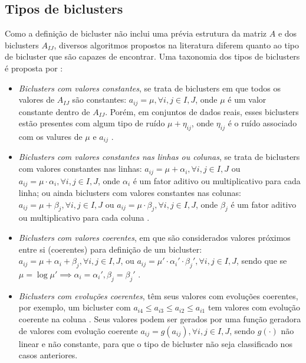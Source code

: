 \documentclass[normaltoc, espacoumemeio, pnumromarab,ruledheader]{abnt}
\begin{document}
\subsection{Tipos de biclusters}
\label{sec:tiposbic}

Como a definição de bicluster não inclui uma prévia estrutura da matriz $A$ e dos biclusters $A_{IJ}$, diversos algoritmos propostos na literatura diferem quanto ao tipo de bicluster que são capazes de encontrar. Uma taxonomia dos tipos de biclusters é proposta por :
 \begin{itemize}
  \item \textit{Biclusters com valores constantes}, se trata de biclusters em que todos os valores de $A_{IJ}$ são constantes: $a_{ij} = \mu, \forall i,j \in I,J$, onde $\mu$ é um valor constante dentro de $A_{IJ}$. Porém, em conjuntos de dados reais, esses biclusters estão presentes com algum tipo de ruído $\mu + \eta_{ij}$, onde $\eta_{ij}$ é o ruído associado com os valures de $\mu$ e $a_{ij}$ \cite{Madeira2004}.
  \item \textit{Biclusters com valores constantes nas linhas ou colunas}, se trata de biclusters com valores constantes nas linhas: $a_{ij} = \mu + \alpha_i, \forall i,j \in I,J$ ou $a_{ij} = \mu \cdot \alpha_i, \forall i,j \in I,J$, onde $\alpha_i$ é um fator aditivo ou multiplicativo para cada linha; ou ainda biclusters com valores constantes nas colunas: $a_{ij} = \mu + \beta_j, \forall i,j \in I,J$ ou $a_{ij} = \mu \cdot \beta_j, \forall i,j \in I,J$, onde $\beta_j$ é um fator aditivo ou multiplicativo para cada coluna \cite{Madeira2004}.
  \item \textit{Biclusters com valores coerentes}, em que são considerados valores próximos entre si (coerentes) para definição de um bicluster: $a_{ij} = \mu + \alpha_i + \beta_j, \forall i,j \in I,J$, ou $a_{ij} = \mu' \cdot \alpha_i' \cdot \beta_j', \forall i,j \in I,J$, sendo que se $\mu = \log \mu'\implies \alpha_i = \alpha_i', \beta_j = \beta_j'$ \cite{Madeira2004}.
  \item \textit{Biclusters com evoluções coerentes}, têm seus valores com evoluções coerentes, por exemplo, um bicluster com $a_{i4} \leq a_{i3} \leq a_{i2} \leq a_{i1}$ tem valores com evolução coerente na coluna \cite{Madeira2004}. Seus valores podem ser gerados por uma função geradora de valores com evolução coerente $a_{ij} = g(a_{ij}), \forall i,j \in I,J$, sendo $g(\cdot)$ não linear e não constante, para que o tipo de bicluster não seja classificado nos casos anteriores.
 \end{itemize}
\end{document}
